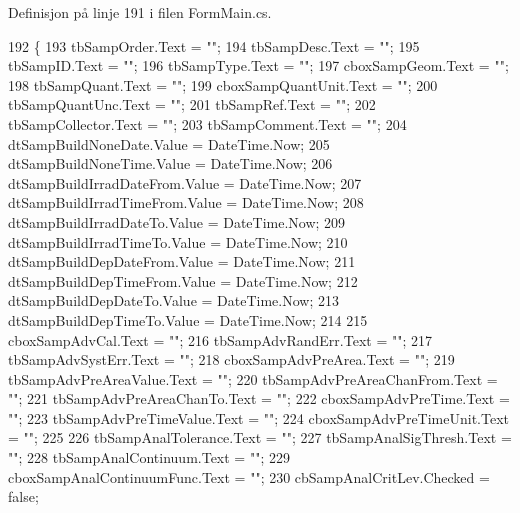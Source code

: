 Definisjon på linje 191 i filen Form\+Main.\+cs.


\begin{DoxyCode}
192         \{
193             tbSampOrder.Text = \textcolor{stringliteral}{""};
194             tbSampDesc.Text = \textcolor{stringliteral}{""};
195             tbSampID.Text = \textcolor{stringliteral}{""};
196             tbSampType.Text = \textcolor{stringliteral}{""};
197             cboxSampGeom.Text = \textcolor{stringliteral}{""};
198             tbSampQuant.Text = \textcolor{stringliteral}{""};
199             cboxSampQuantUnit.Text = \textcolor{stringliteral}{""};
200             tbSampQuantUnc.Text = \textcolor{stringliteral}{""};
201             tbSampRef.Text = \textcolor{stringliteral}{""};
202             tbSampCollector.Text = \textcolor{stringliteral}{""};
203             tbSampComment.Text = \textcolor{stringliteral}{""};
204             dtSampBuildNoneDate.Value = DateTime.Now;
205             dtSampBuildNoneTime.Value = DateTime.Now;
206             dtSampBuildIrradDateFrom.Value = DateTime.Now;
207             dtSampBuildIrradTimeFrom.Value = DateTime.Now;
208             dtSampBuildIrradDateTo.Value = DateTime.Now;
209             dtSampBuildIrradTimeTo.Value = DateTime.Now;
210             dtSampBuildDepDateFrom.Value = DateTime.Now;
211             dtSampBuildDepTimeFrom.Value = DateTime.Now;
212             dtSampBuildDepDateTo.Value = DateTime.Now;
213             dtSampBuildDepTimeTo.Value = DateTime.Now;
214 
215             cboxSampAdvCal.Text = \textcolor{stringliteral}{""};
216             tbSampAdvRandErr.Text = \textcolor{stringliteral}{""};
217             tbSampAdvSystErr.Text = \textcolor{stringliteral}{""};
218             cboxSampAdvPreArea.Text = \textcolor{stringliteral}{""};
219             tbSampAdvPreAreaValue.Text = \textcolor{stringliteral}{""};
220             tbSampAdvPreAreaChanFrom.Text = \textcolor{stringliteral}{""};
221             tbSampAdvPreAreaChanTo.Text = \textcolor{stringliteral}{""};
222             cboxSampAdvPreTime.Text = \textcolor{stringliteral}{""};
223             tbSampAdvPreTimeValue.Text = \textcolor{stringliteral}{""};
224             cboxSampAdvPreTimeUnit.Text = \textcolor{stringliteral}{""};
225 
226             tbSampAnalTolerance.Text = \textcolor{stringliteral}{""};
227             tbSampAnalSigThresh.Text = \textcolor{stringliteral}{""};
228             tbSampAnalContinuum.Text = \textcolor{stringliteral}{""};
229             cboxSampAnalContinuumFunc.Text = \textcolor{stringliteral}{""};
230             cbSampAnalCritLev.Checked = \textcolor{keyword}{false};

\end{DoxyCode}
